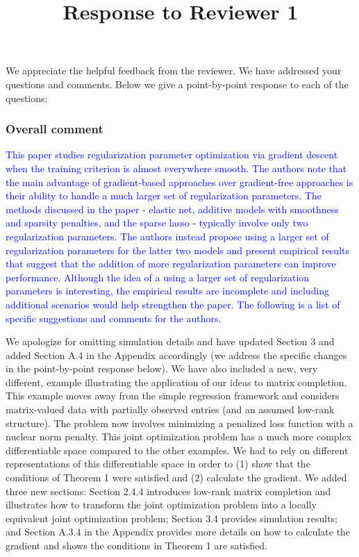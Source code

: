 \documentclass[]{article}
\title{Response to Reviewer 1}
\newcommand{\overall}[1]{\textcolor{blue}{#1}}
\begin{document}
	
	\maketitle
	
	We appreciate the helpful feedback from the reviewer. We have addressed your questions and comments. Below we give a point-by-point response to each of the questions:
	
	\subsubsection*{Overall comment}
	\overall{This paper studies regularization parameter optimization via gradient descent when the training criterion is almost everywhere smooth. The authors note that the main advantage of gradient-based approaches over gradient-free approaches is their ability to handle a much larger set of regularization parameters. The methods discussed in the paper - elastic net, additive models with smoothness and sparsity penalties, and the sparse lasso - typically involve only two regularization parameters. The authors instead propose using a larger set of regularization parameters for the latter two models and present empirical results that suggest that the addition of more regularization parameters can improve performance. Although the idea of a using a larger set of regularization parameters is interesting, the empirical results are incomplete and including additional scenarios would help strengthen the paper. The following is a list of specific suggestions and comments for the authors.}
	
	We apologize for omitting simulation details and have updated Section 3 and added Section A.4 in the Appendix accordingly (we address the specific changes in the point-by-point response below). We have also included a new, very different, example illustrating the application of our ideas to matrix completion. This example moves away from the simple regression framework and considers matrix-valued data with partially observed entries (and an assumed low-rank structure). The problem now involves minimizing a penalized loss function with a nuclear norm penalty. This joint optimization problem has a much more complex differentiable space compared to the other examples. We had to rely on different representations of this differentiable space in order to (1) show that the conditions of Theorem 1 were satisfied and (2) calculate the gradient. We added three new sections: Section 2.4.4 introduces low-rank matrix completion and illustrates how to transform the joint optimization problem into a locally equivalent joint optimization problem; Section 3.4 provides simulation results; and Section A.3.4 in the Appendix provides more details on how to calculate the gradient and shows the conditions in Theorem 1 are satisfied.
		
\end{document}
